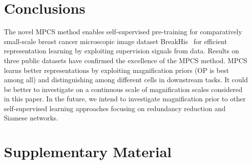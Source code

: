 \documentclass[conference]{IEEEtran}
\begin{document}
 
\section{Conclusions}
The novel MPCS method enables self-supervised pre-training for comparatively small-scale breast cancer microscopic image dataset BreakHis~\cite{spanhol2016dataset} for efficient representation learning by exploiting supervision signals from data.
Results on three public datasets have confirmed the excellence of the MPCS method. MPCS learns better representations by exploiting magnification priors (OP is best among all) and distinguishing among different cells in downstream tasks. It could be better to investigate on a continuous scale of magnification scales considered in this paper. In the future, we intend to investigate magnification prior to other self-supervised learning approaches focusing on redundancy reduction and Siamese networks.


\begin{comment}
\begin{itemize}
    \color{blue}
    \item TODO - explored self supervised paradigm on histopathlogical images in general , specifically on BreakHis
    \item TODO - Presented SSL method which works on small scale dataset by emphasizes on reducing human prior and by exploit data signals from data, using inductive transfer from image-net.
     1. obtains SOTA only on 20\% labeled data
     2. Outperforms previous SOTA i n fully supervised setting
     3. Cross magnifications performance - out of distribution generalization
     \item TODO -Empirical evidence on effect of inducted human prior on potential of network's learning 
\end{itemize}
Future work
\begin{itemize}
\color{blue}
\color{blue}
    \item TODO - Investigation on domain adaptation, additional down stream tasks, Further exploration to reduce human prior in SSL in contrastive and other ssl paradigm,Focusing other architectural alternatives, training protocol, incorporating unsupervised and self-supervised transfer learning possibilities from imagenet and other domains. 
\end{itemize}
\end{comment}

 
{


}
\pagebreak
\section{Supplementary Material}
\end{document}
